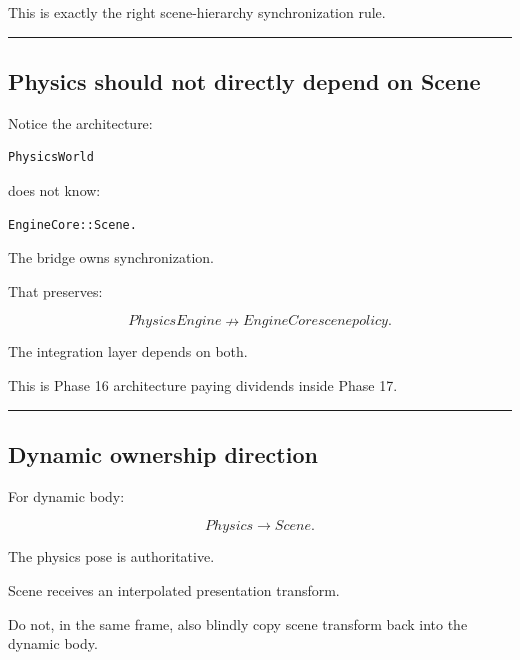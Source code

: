 This is exactly the right scene-hierarchy synchronization rule.

\begin{center}\rule{0.5\linewidth}{0.5pt}\end{center}

\subsection{Physics should not directly depend on Scene}\label{06-engine-ii-ch037-physics-should-not-directly-depend-on-scene}

\hypertarget{06-engine-ii-ch037-physics-should-not-directly-depend-on-scene}{}

Notice the architecture:

\begin{verbatim}
PhysicsWorld
\end{verbatim}

does not know:

\begin{verbatim}
EngineCore::Scene.
\end{verbatim}

The bridge owns synchronization.

That preserves:

\[
PhysicsEngine
\nrightarrow
EngineCore scene policy.
\]

The integration layer depends on both.

This is Phase 16 architecture paying dividends inside Phase 17.

\begin{center}\rule{0.5\linewidth}{0.5pt}\end{center}

\subsection{Dynamic ownership direction}\label{06-engine-ii-ch037-dynamic-ownership-direction}

\hypertarget{06-engine-ii-ch037-dynamic-ownership-direction}{}

For dynamic body:

\[
\boxed{
Physics\rightarrow Scene.
}
\]

The physics pose is authoritative.

Scene receives an interpolated presentation transform.

Do not, in the same frame, also blindly copy scene transform back into the dynamic body.

